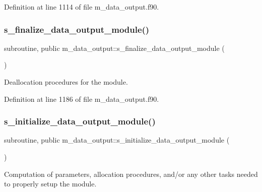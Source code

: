 Definition at line 1114 of file m\+\_\+data\+\_\+output.\+f90.

\mbox{\label{namespacem__data__output_a02f2b04a434c1f0ebf9156147d0f976e}} 
\subsubsection{\texorpdfstring{s\+\_\+finalize\+\_\+data\+\_\+output\+\_\+module()}{s\_finalize\_data\_output\_module()}}
{\footnotesize\ttfamily subroutine, public m\+\_\+data\+\_\+output\+::s\+\_\+finalize\+\_\+data\+\_\+output\+\_\+module (\begin{DoxyParamCaption}{ }\end{DoxyParamCaption})}



Deallocation procedures for the module. 



Definition at line 1186 of file m\+\_\+data\+\_\+output.\+f90.

\mbox{\label{namespacem__data__output_ab65b312ef83adb104cafafada9c998b6}} 
\subsubsection{\texorpdfstring{s\+\_\+initialize\+\_\+data\+\_\+output\+\_\+module()}{s\_initialize\_data\_output\_module()}}
{\footnotesize\ttfamily subroutine, public m\+\_\+data\+\_\+output\+::s\+\_\+initialize\+\_\+data\+\_\+output\+\_\+module (\begin{DoxyParamCaption}{ }\end{DoxyParamCaption})}



Computation of parameters, allocation procedures, and/or any other tasks needed to properly setup the module. 



